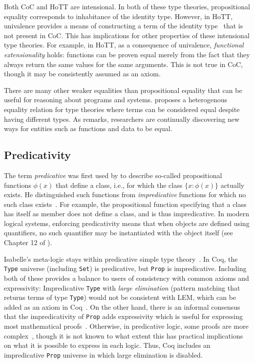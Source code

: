 Both CoC and HoTT are intensional. In both of these type theories,
propositional equality corresponds to inhabitance of the identity type. However, in HoTT,
univalence provides a means of constructing a term of the identity type~\citep{escardo2018self}
that is not present in CoC. This has implications for other properties of these intensional
type theories. For example, in HoTT, as a consequence of univalence, \textit{functional extensionality} holds: functions
can be proven equal merely from the fact that they always return the same values for the same arguments.
This is not true in CoC, though it may be consistently assumed as an axiom.

There are many other weaker equalities %
than propositional equality that can be useful for reasoning about programs and systems. \cite{McBride2002} proposes a heterogenous equality relation for type theories where terms can be considered equal despite having different types. As \cite{CPDT} remarks, researchers are continually discovering new ways for entities such as functions and data to be equal.

\subsection{Predicativity}

The term \emph{predicative} was first used by \cite{Russell1906} to describe so-called propositional functions $\phi(x)$ that define a class, i.e., for which the class $\{x : \phi(x)\}$ actually exists. He distinguished such functions from \emph{impredicative} functions for which no such class exists~\citep{Feferman2005}. For example, the propositional function specifying that a class has itself as member does not define a class, and is thus impredicative. In modern logical systems, enforcing predicativity means that when objects are defined using quantifiers, no such quantifier may be instantiated with the object itself (see Chapter 12 of \cite{CPDT}).

Isabelle's meta-logic stays within predicative simple type theory~\citep{Paulson2000}.
In Coq, the \lstinline{Type} universe (including \lstinline{Set}) is predicative, but \lstinline{Prop} is impredicative.
Including both of these provides a balance to users of consistency with common axioms and expressivity:
Impredicative \lstinline{Type} with \textit{large elimination} (pattern matching that returns terms of type \lstinline{Type})
would not be consistent with LEM, which can be added as an axiom in Coq~\citep{predicavity1}.
On the other hand, there is an informal
consensus that the impredicativity of \lstinline{Prop} adds expressivity which is useful for expressing
most mathematical proofs~\citep{predicavity1}.
Otherwise, in predicative logic, some proofs are more complex~\citep{predicativity2},
though it is not known to what extent this has practical implications on what it is possible to express in each logic.
Thus, Coq includes an impredicative \lstinline{Prop} universe in which large elimination is disabled.

